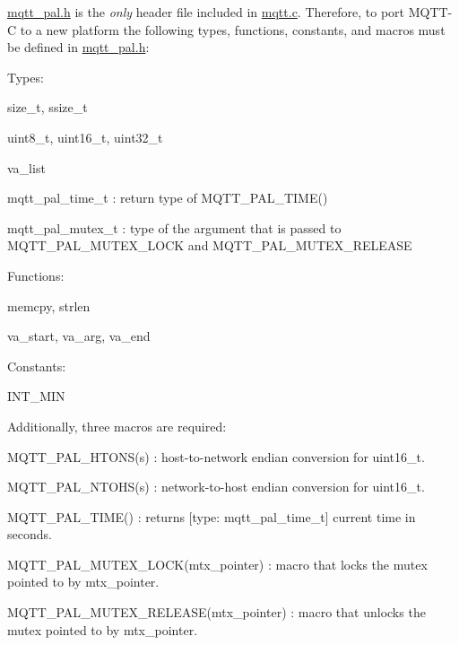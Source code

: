 \hyperlink{mqtt__pal_8h}{mqtt\+\_\+pal.\+h} is the {\itshape only} header file included in \hyperlink{mqtt_8c}{mqtt.\+c}. Therefore, to port M\+Q\+T\+T-\/C to a new platform the following types, functions, constants, and macros must be defined in \hyperlink{mqtt__pal_8h}{mqtt\+\_\+pal.\+h}\+:
\begin{DoxyItemize}
\item Types\+:
\begin{DoxyItemize}
\item {\ttfamily size\+\_\+t}, {\ttfamily ssize\+\_\+t} 
\item {\ttfamily uint8\+\_\+t}, {\ttfamily uint16\+\_\+t}, {\ttfamily uint32\+\_\+t} 
\item {\ttfamily va\+\_\+list} 
\item {\ttfamily mqtt\+\_\+pal\+\_\+time\+\_\+t} \+: return type of {\ttfamily M\+Q\+T\+T\+\_\+\+P\+A\+L\+\_\+\+T\+I\+M\+E()} 
\item {\ttfamily mqtt\+\_\+pal\+\_\+mutex\+\_\+t} \+: type of the argument that is passed to {\ttfamily M\+Q\+T\+T\+\_\+\+P\+A\+L\+\_\+\+M\+U\+T\+E\+X\+\_\+\+L\+O\+CK} and {\ttfamily M\+Q\+T\+T\+\_\+\+P\+A\+L\+\_\+\+M\+U\+T\+E\+X\+\_\+\+R\+E\+L\+E\+A\+SE} 
\end{DoxyItemize}
\item Functions\+:
\begin{DoxyItemize}
\item {\ttfamily memcpy}, {\ttfamily strlen} 
\item {\ttfamily va\+\_\+start}, {\ttfamily va\+\_\+arg}, {\ttfamily va\+\_\+end} 
\end{DoxyItemize}
\item Constants\+:
\begin{DoxyItemize}
\item {\ttfamily I\+N\+T\+\_\+\+M\+IN} 
\end{DoxyItemize}
\end{DoxyItemize}

Additionally, three macro\textquotesingle{}s are required\+:
\begin{DoxyItemize}
\item {\ttfamily M\+Q\+T\+T\+\_\+\+P\+A\+L\+\_\+\+H\+T\+O\+N\+S(s)} \+: host-\/to-\/network endian conversion for uint16\+\_\+t.
\item {\ttfamily M\+Q\+T\+T\+\_\+\+P\+A\+L\+\_\+\+N\+T\+O\+H\+S(s)} \+: network-\/to-\/host endian conversion for uint16\+\_\+t.
\item {\ttfamily M\+Q\+T\+T\+\_\+\+P\+A\+L\+\_\+\+T\+I\+M\+E()} \+: returns \mbox{[}type\+: {\ttfamily mqtt\+\_\+pal\+\_\+time\+\_\+t}\mbox{]} current time in seconds.
\item {\ttfamily M\+Q\+T\+T\+\_\+\+P\+A\+L\+\_\+\+M\+U\+T\+E\+X\+\_\+\+L\+O\+C\+K(mtx\+\_\+pointer)} \+: macro that locks the mutex pointed to by {\ttfamily mtx\+\_\+pointer}.
\item {\ttfamily M\+Q\+T\+T\+\_\+\+P\+A\+L\+\_\+\+M\+U\+T\+E\+X\+\_\+\+R\+E\+L\+E\+A\+S\+E(mtx\+\_\+pointer)} \+: macro that unlocks the mutex pointed to by {\ttfamily mtx\+\_\+pointer}.
\end{DoxyItemize}


